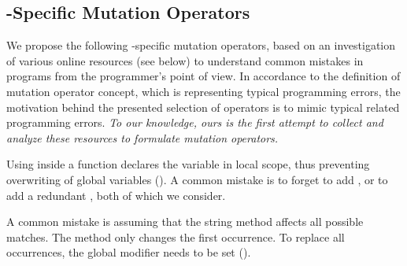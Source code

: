 \subsection{\javascript-Specific Mutation Operators} 
We propose the following \javascript-specific mutation operators, based on an investigation of various online resources (see below)
to understand  common mistakes in \javascript programs from the programmer's point of view.  In accordance to the definition of mutation operator concept, which is representing typical programming errors, the motivation behind the presented selection of operators is to mimic typical \javascript related programming errors.
{\em To our knowledge, ours is the first attempt to collect and analyze these resources to formulate \javascript mutation operators.}



 Using  inside a function declares the variable in local scope, thus preventing overwriting of global variables (\cite{hsuJsAntiPatterns, osmaniJsPatterns,Crockford:2008}). A common mistake is to forget to add , or to add a redundant , both of which we consider. 

 A common mistake is assuming that the string  method affects all possible matches. The  method only changes the first occurrence.
To replace all occurrences, the global modifier needs to be set (\cite{weylJsGotchas, jsStringReplace, roy3commmonJsMistakes}).

